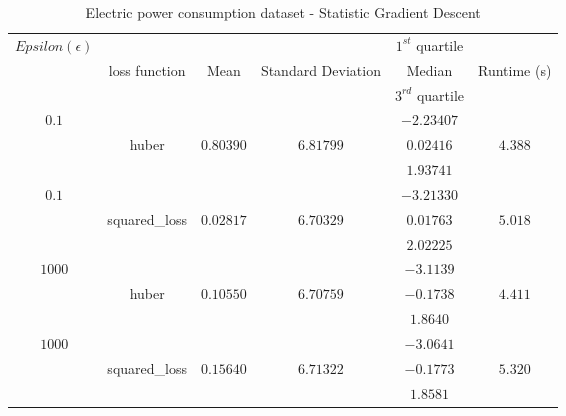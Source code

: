 \begin{table}[p]
\begin{center} 
\begin{tabular}{|c|c|c|c|c|c|}
			\hline \multirow{3}{*}{$Epsilon (\epsilon)$} &&&& $1^{st}$ quartile
			&\\&loss function&Mean&Standard Deviation&Median& Runtime (s)\\&&&& $3^{rd}$
			quartile &\\
			\hline \multirow{3}{*}{$0.1$}&&&&$-2.23407$&\\
			& huber & $0.80390$ & $6.81799$  & $0.02416$ & $4.388$\\
			&&&&$1.93741$& \\
			\hline \multirow{3}{*}{$0.1$}&&&&$-3.21330$ &\\
			& squared\_loss & $0.02817$ & $6.70329$  & $0.01763$ & $5.018$\\
			&&&&	$2.02225$& \\
			\hline \multirow{3}{*}{$1000$}&&&&	$-3.1139$ &\\
			& huber & $0.10550$ & $6.70759$  & $-0.1738$ & $4.411$\\
			&&&&	$1.8640$& \\
			\hline \multirow{3}{*}{$1000$}&&&&	$-3.0641$ &\\
			&squared\_loss & $0.15640$ & $6.71322$  & $-0.1773$ & $5.320$\\
			&&&&	$1.8581$& \\
			\hline

		\end{tabular}
	\end{center}

\caption{Electric power consumption dataset - Statistic Gradient Descent\label{ypmsd:table:ds3sgdresults}}

\end{table}




